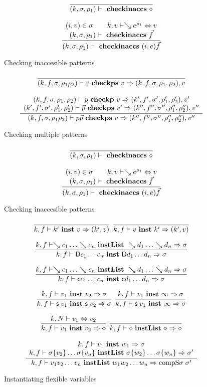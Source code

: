 \begin{figure}
\begin{gather*}
\ \dfrac{}{
(k,\sigma,\rho_1)\vdash\mbox{ \textbf{checkinaccs} }\diamond
}
\\[2ex]
\ \dfrac{\begin{array}[b]{c}
(i,v) \in \sigma \qquad
k,v\vdash\searrow e^{\rho_1}\Leftrightarrow v
\\
(k,\sigma,\rho_1)\vdash\mbox{ \textbf{checkinaccs} }\vec{f}
\end{array}}{
(k,\sigma,\rho_1)\vdash\mbox{ \textbf{checkinaccs} }(i,e) \vec{f}
}
\end{gather*}
\caption{Checking inaccesible patterns}
\end{figure}

\begin{figure}
\begin{gather*}
\ \dfrac{}{
(k,f,\sigma,\rho_1\rho_2)\vdash\diamond\mbox{ \textbf{checkps} }v\Rightarrow (k,f,\sigma,\rho_1,\rho_2),v}
\\[2ex]
\ \dfrac{\begin{array}[b]{c}(k,f,\sigma,\rho_1,\rho_2)\vdash p\mbox{ \textbf{checkp} }v\Rightarrow (k',f',\sigma',\rho'_1,\rho'_2),v'
\\(k',f',\sigma',\rho'_1,\rho'_2)\vdash\vec{p}\mbox{ \textbf{checkps} }v'\Rightarrow (k'',f'',\sigma'',\rho''_1,\rho''_2),v''
\end{array}}{
(k,f,\sigma,\rho_1\rho_2)\vdash p \vec{p}\mbox{ \textbf{checkps} }v\Rightarrow (k'',f'',\sigma'',\rho''_1,\rho''_2),v''}
\end{gather*}
\caption{Checking multiple patterns}
\end{figure}

\begin{figure}
\begin{gather*}
\ \dfrac{}{
(k,\sigma,\rho_1)\vdash\mbox{ \textbf{checkinaccs} }\diamond
}
\\[2ex]
\ \dfrac{\begin{array}[b]{c}
(i,v) \in \sigma \qquad
k,v\vdash\searrow e^{\rho_1}\Leftrightarrow v
\\
(k,\sigma,\rho_1)\vdash\mbox{ \textbf{checkinaccs} }\vec{f}
\end{array}}{
(k,\sigma,\rho_1)\vdash\mbox{ \textbf{checkinaccs} }(i,e) \vec{f}
}
\end{gather*}
\caption{Checking inaccesible patterns}
\end{figure}


\begin{figure}
\begin{gather*}
\nru{}
{}
{\inst{k}{f}{k'}{v}{(k',v)}}
%
\nru{}
{}
{\inst{k}{f}{v}{k'}{(k',v)}}
%
\\[2ex]
\nru{}
{{\instlist{k}{f}{\wh{c_1} \ldots \wh{c_n}}{\wh{d_1} \ldots \wh{d_n}}{\sigma}}}
{\inst{k}{f}{\DD c_1 \ldots c_n}{\DD d_1 \ldots d_n}{\sigma}
}
\\[2ex]
\nru{}
{{\instlist{k}{f}{\wh{c_1} \ldots \wh{c_n}}{\wh{d_1} \ldots \wh{d_n}}{\sigma}}}
{\inst{k}{f}{\cc c_1 \ldots c_n}{\cc d_1 \ldots d_n}{\sigma}
}
\\[2ex]
\nru{}
{\inst{k}{f}{v_1}{v_2}{\sigma}}
{\inst{k}{f}{\s v_1}{\s v_2}{\sigma}
}
\nru{}
{\inst{k}{f}{v_1}{\infty}{\sigma}}
{\inst{k}{f}{\s v_1}{\infty}{\sigma}
}
\\[2ex]
\nru{}
{\EqVal{k}{N}{v_1}{v_2}}
{\inst{k}{f}{v_1}{v_2}{\diamond}
}
\nru{}
{}
{\instlist{k}{f}{\diamond}{\diamond}{\diamond}}
\\[2ex]
\ndru{}
{\inst{k}{f}{v_1}{w_1}{\sigma}}
{\instlist{k}{f}{\subst{\sigma}{v_2} \ldots \subst{\sigma}{v_n}}{\subst{\sigma}{w_2} \ldots \subst{\sigma}{w_n}}{\sigma'}}
{\instlist{k}{f}{v_1 v_2 \ldots v_n}{w_1 w_2 \ldots w_n}{\compS \sigma \sigma'}}
\end{gather*}
\caption{Instantiating flexible variables}
\end{figure}

